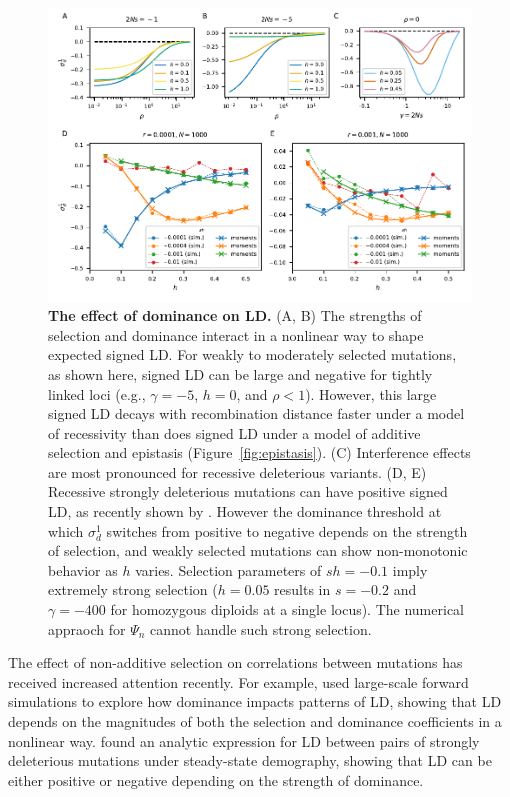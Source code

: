 \documentclass[]{article}
\begin{document}
\begin{figure}[tb!]
    \centering
    \includegraphics{../figures/dominance_roze}
    \caption{
        \textbf{The effect of dominance on LD.}
        (A, B) The strengths of selection and dominance interact in a nonlinear way
        to shape expected signed LD. For weakly to moderately selected mutations,
        as shown here, signed LD can be large and negative for tightly linked loci
        (e.g., \(\gamma=-5\), \(h=0\), and \(\rho < 1\)). However, this large signed
        LD decays with recombination distance faster under a model of recessivity
        than does signed LD under a model of additive selection and
        epistasis (Figure~\ref{fig:epistasis}).
        (C) Interference effects are most pronounced for recessive deleterious
        variants.
        (D, E) Recessive strongly deleterious mutations can have positive signed
        LD, as recently shown by \citet{Roze2021-cf}.
        However the dominance threshold at which \(\sigma_d^1\) switches from
        positive to negative depends on the strength of selection, and weakly
        selected mutations can show non-monotonic behavior as $h$ varies.
        Selection parameters of \(sh=-0.1\) imply extremely strong selection
        (\(h=0.05\) results in \(s=-0.2\) and \(\gamma=-400\) for homozygous
        diploids at a single locus). The numerical appraoch for \(\Psi_n\)
        cannot handle such strong selection.
    }
    \label{fig:dominance}
\end{figure}

The effect of non-additive selection on correlations between mutations has
received increased attention recently. For example, \citet{Garcia2021-zn} used
large-scale forward simulations to explore how dominance impacts patterns of
LD, showing that LD depends on the magnitudes of both the selection and
dominance coefficients in a nonlinear way. \citet{Roze2021-cf} found an
analytic expression for LD between pairs of strongly deleterious mutations
under steady-state demography, showing that LD can be either positive or
negative depending on the strength of dominance.
\end{document}
